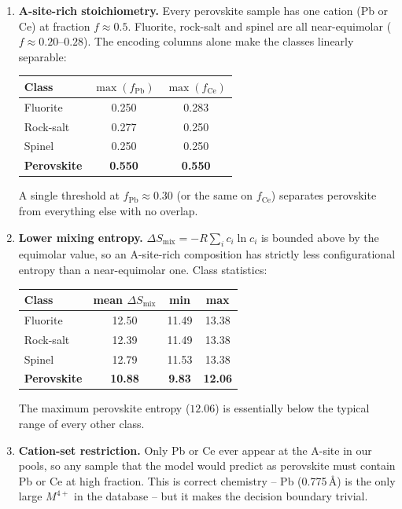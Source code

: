 \documentclass[11pt]{article}
\begin{document}
\begin{enumerate}
  \item \textbf{A-site-rich stoichiometry.} Every perovskite sample has one
        cation (Pb or Ce) at fraction $f \approx 0.5$. Fluorite, rock-salt
        and spinel are all near-equimolar ($f \approx 0.20$--$0.28$). The
        encoding columns alone make the classes linearly separable:
        \begin{table}[h]
        \centering
        \begin{tabular}{lcc}
        \toprule
        Class      & $\max(f_\mathrm{Pb})$ & $\max(f_\mathrm{Ce})$ \\
        \midrule
        Fluorite   & 0.250 & 0.283 \\
        Rock-salt  & 0.277 & 0.250 \\
        Spinel     & 0.250 & 0.250 \\
        \textbf{Perovskite} & \textbf{0.550} & \textbf{0.550} \\
        \bottomrule
        \end{tabular}
        \end{table}

        \noindent A single threshold at $f_\mathrm{Pb} \approx 0.30$ (or the
        same on $f_\mathrm{Ce}$) separates perovskite from everything else
        with no overlap.

  \item \textbf{Lower mixing entropy.}
        $\Delta S_\text{mix} = -R\sum_i c_i \ln c_i$ is bounded above by the
        equimolar value, so an A-site-rich composition has strictly less
        configurational entropy than a near-equimolar one. Class statistics:
        \begin{table}[h]
        \centering
        \begin{tabular}{lccc}
        \toprule
        Class      & mean $\Delta S_\text{mix}$ & min   & max   \\
        \midrule
        Fluorite   & 12.50 & 11.49 & 13.38 \\
        Rock-salt  & 12.39 & 11.49 & 13.38 \\
        Spinel     & 12.79 & 11.53 & 13.38 \\
        \textbf{Perovskite} & \textbf{10.88} & \textbf{9.83}  & \textbf{12.06} \\
        \bottomrule
        \end{tabular}
        \end{table}

        \noindent The maximum perovskite entropy ($12.06$) is essentially
        below the typical range of every other class.

  \item \textbf{Cation-set restriction.} Only Pb or Ce ever appear at the
        A-site in our pools, so any sample that the model would predict as
        perovskite must contain Pb or Ce at high fraction. This is correct
        chemistry -- Pb (0.775\,\AA) is the only large $M^{4+}$ in the
        database -- but it makes the decision boundary trivial.
\end{enumerate}
\end{document}
